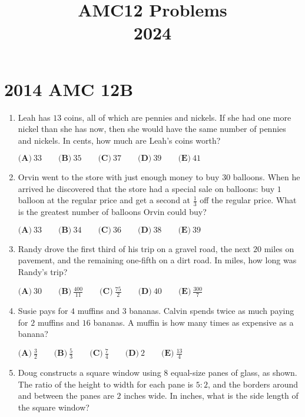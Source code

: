 \documentclass{article}
\title{AMC12 Problems \\ 2024}
\date{}
\begin{document}
\maketitle\thispagestyle{fancy}\newpage\section*{2014 AMC 12B}\begin{enumerate}[label=\arabic*., itemsep=0.5em]\item Leah has \( 13 \) coins, all of which are pennies and nickels. If she had one more nickel than she has now, then she would have the same number of pennies and nickels. In cents, how much are Leah's coins worth?

\( \textbf{(A)}\ 33\qquad\textbf{(B)}\ 35\qquad\textbf{(C)}\ 37\qquad\textbf{(D)}\ 39\qquad\textbf{(E)}\ 41 \)\par \vspace{0.5em}\item Orvin went to the store with just enough money to buy \( 30 \) balloons. When he arrived he discovered that the store had a special sale on balloons: buy \( 1 \) balloon at the regular price and get a second at \( \frac{1}{3} \) off the regular price. What is the greatest number of balloons Orvin could buy?

\( \textbf{(A)}\ 33\qquad\textbf{(B)}\ 34\qquad\textbf{(C)}\ 36\qquad\textbf{(D)}\ 38\qquad\textbf{(E)}\ 39 \)\par \vspace{0.5em}\item Randy drove the first third of his trip on a gravel road, the next \( 20 \) miles on pavement, and the remaining one-fifth on a dirt road. In miles, how long was Randy's trip?

\( \textbf{(A)}\ 30\qquad\textbf{(B)}\ \frac{400}{11}\qquad\textbf{(C)}\ \frac{75}{2}\qquad\textbf{(D)}\ 40\qquad\textbf{(E)}\ \frac{300}{7} \)\par \vspace{0.5em}\item Susie pays for \( 4 \) muffins and \( 3 \) bananas. Calvin spends twice as much paying for \( 2 \) muffins and \( 16 \) bananas. A muffin is how many times as expensive as a banana?

\( \textbf{(A)}\ \frac{3}{2}\qquad\textbf{(B)}\ \frac{5}{3}\qquad\textbf{(C)}\ \frac{7}{4}\qquad\textbf{(D)}\ 2\qquad\textbf{(E)}\ \frac{13}{4} \)\par \vspace{0.5em}\item Doug constructs a square window using \( 8 \) equal-size panes of glass, as shown. The ratio of the height to width for each pane is \( 5 : 2 \), and the borders around and between the panes are \( 2 \) inches wide. In inches, what is the side length of the square window?


\end{enumerate}
\end{document}
